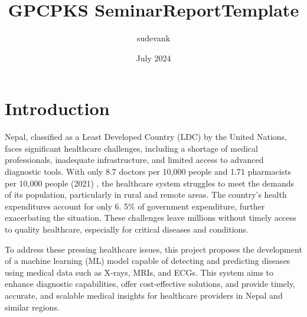 \documentclass[12pt,a4paper]{report}
\title{GPCPKS SeminarReportTemplate}
\author{sudevank }
\date{July 2024}
\begin{document}
\gdef \title{How to prepare a Seminar report using \LaTeX } %
\gdef \author{Student Name}	 %
\gdef \dept{Electronics  Engineering} %
\gdef \degree{Diploma } %
\gdef \branch{Electronics  Engineering} %
\gdef \college{Government Polytechnic College}
\gdef \collegeplace{Palakkad}
\gdef \rollno{TVE17EC0XY} %
\gdef \deptabbr{Dept.of Electronics} %
\gdef \guide{Lecture-1}
\gdef \hod{Dr. Dileep P} %
\gdef \hoddes{Professor and Head} %

\gdef \acadyear{2024 - 25} %
\gdef \month{November 2024} %
\gdef \date{21-11-2020} %
\setcounter{secnumdepth}{1} 


%
 



\thispagestyle{empty}
\newpage
\tableofcontents
\listoffigures

\cleardoublepage
\setcounter{page}{1}
\chapter{ Introduction}

Nepal, classified as a Least Developed Country (LDC) \cite{Nepal_un} by the United Nations, faces significant healthcare challenges, including a shortage of medical professionals, inadequate infrastructure, and limited access to advanced diagnostic tools. With only 8.7 doctors per 10,000 people and 1.71 pharmacists per 10,000 people (2021) \cite{Nepal_profile}, the healthcare system struggles to meet the demands of its population, particularly in rural and remote areas. The country's health expenditures account for only 6. 5\% \cite{Nepal_un}of government expenditure, further exacerbating the situation. These challenges leave millions without timely access to quality healthcare, especially for critical diseases and conditions.

To address these pressing healthcare issues, this project proposes the development of a machine learning (ML) model capable of detecting and predicting diseases using medical data such as X-rays, MRIs, and ECGs. This system aims to enhance diagnostic capabilities, offer cost-effective solutions, and provide timely, accurate, and scalable medical insights for healthcare providers in Nepal and similar regions.
\end{document}
